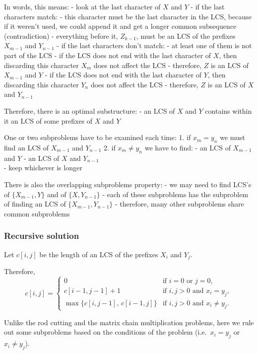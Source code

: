 \documentclass[11pt]{article}
\begin{document}
In words, this means: - look at the last character of \(X\) and \(Y\) -
if the last characters match: - this character must be the last
character in the LCS, because if it weren't used, we could append it and
get a longer common subsequence (contradiction) - everything before it,
\(Z_{k-1}\), must be an LCS of the prefixes \(X_{m-1}\) and \(Y_{n-1}\)
- if the last characters don't match: - at least one of them is not part
of the LCS - if the LCS does not end with the last character of \(X\),
then discarding this character \(X_m\) does not affect the LCS -
therefore, \(Z\) is an LCS of \(X_{m-1}\) and \(Y\) - if the LCS does
not end with the last character of \(Y\), then discarding this character
\(Y_n\) does not affect the LCS - therefore, \(Z\) is an LCS of \(X\)
and \(Y_{n-1}\)

Therefore, there is an optimal substructure: - an LCS of \(X\) and \(Y\)
contains within it an LCS of some prefixes of \(X\) and \(Y\)

One or two subproblems have to be examined each time: 1. if
\(x_m = y_n\) we must find an LCS of \(X_{m-1}\) and \(Y_{n-1}\) 2. if
\(x_m \neq y_n\) we have to find: - an LCS of \(X_{m-1}\) and \(Y\) - an
LCS of \(X\) and \(Y_{n-1}\)\\
- keep whichever is longer

There is also the overlapping subproblems property: - we may need to
find LCS's of \(\{X_{m-1}, Y\}\) and of \(\{X, Y_{n-1}\}\) - each of
these subproblems has the subproblem of finding an LCS of
\(\{X_{m-1}, Y_{n-1}\}\) - therefore, many other subproblems share
common subproblems

    \subsubsection{Recursive solution}\label{recursive-solution}

Let \(c[i, j]\) be the length of an LCS of the prefixes \(X_i\) and
\(Y_j\).

Therefore, \[
c[i, j] =
\begin{cases}
0 & \text{if } i = 0 \text{ or } j = 0, \\
c[i - 1, j - 1] + 1 & \text{if } i, j > 0 \text{ and } x_i = y_j, \\
\max\{c[i, j - 1], \, c[i - 1, j]\} & \text{if } i, j > 0 \text{ and } x_i \ne y_j.
\end{cases}
\]

Unlike the rod cutting and the matrix chain multiplication problems,
here we rule out some subproblems based on the conditions of the problem
(i.e.~\(x_i = y_j\) or \(x_i \neq y_j\)).
\end{document}
